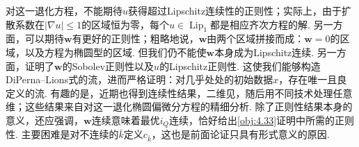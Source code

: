 \label{idx:root4-p161-regularity}对这一退化方程，不能期待$u$获得超过Lipschitz连续性的正则性；实际上，由于扩散系数在$|\nabla u|\leq1$的区域恒为零，每个$u\in\operatorname{Lip}_1$都是相应齐次方程的解. 另一方面，可以期待$\mathbf w$有更好的正则性；粗略地说，$\mathbf w$由两个区域拼接而成：$\mathbf w=0$的区域，以及方程为椭圆型的区域. 但我们仍不能使$\mathbf w$本身成为Lipschitz连续. 另一方面，\cite{b80}证明了$\mathbf w$的Sobolev正则性以及$u$的Lipschitz正则性. 这使我们能够构造DiPerna--Lions式的流\cite{b156}，进而严格证明：对几乎处处的初始数据$x$，存在唯一且良定义的流. 有趣的是，近期也得到连续性结果，二维见\cite{b279}，随后\cite{b126}用不同技术处理任意维；这些结果来自对这一退化椭圆偏微分方程的精细分析. 除了正则性结果本身的意义，还应强调，$\mathbf w$连续意味着最优$i_Q$连续，恰好给出\autoref{obj:4.33}证明中所需的正则性. 主要困难是对不连续的$\bar k$定义$c_{\bar k}$，这也是前面论证只具有形式意义的原因.
